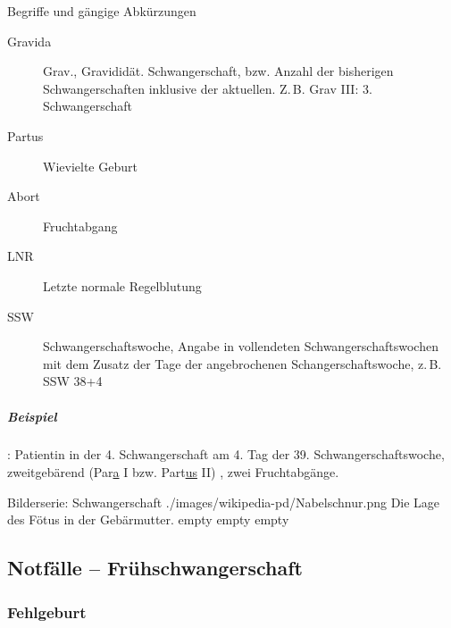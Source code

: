 {Begriffe und gängige Abkürzungen}
{
\begin{description}
  \item[Gravida]  Grav., Gravididät.
  Schwangerschaft, bzw. Anzahl der bisherigen
  Schwangerschaften inklusive der aktuellen. Z.\,B. Grav
  III: 3. Schwangerschaft
  \item[] 
  \item[Partus] Wievielte Geburt
  \item[Abort] Fruchtabgang
  \item[] 
  \item[LNR]  Letzte normale Regelblutung
  \item[SSW] Schwangerschaftswoche, Angabe in vollendeten
  Schwangerschaftswochen mit dem Zusatz der Tage der
  angebrochenen Schangerschaftswoche, z.\,B. SSW 38+4
\end{description}

\subparagraph{Beispiel} : Patientin in der 4. Schwangerschaft am
4.
Tag der 39. Schwangerschaftswoche, zweitgebärend (Par\underline{a} I bzw. Part\underline{us} II) , zwei Fruchtabgänge.

}
{}
{}
{}
{}

\begin{PictureSeriesWide}{}{Bilderserie: Schwangerschaft}
{./images/wikipedia-pd/Nabelschnur.png}
{Die Lage des Fötus in der Gebärmutter.
}
{empty}
{}
{empty}
{}
{empty}
{}
\end{PictureSeriesWide}




\subsection{Notfälle -- Frühschwangerschaft}
\label{topic:notfall-fruehschwangerschaft}

\subsubsection{Fehlgeburt}
%
%
%
\label{topic:fehlgeburt}%
\label{topic:abort}%



